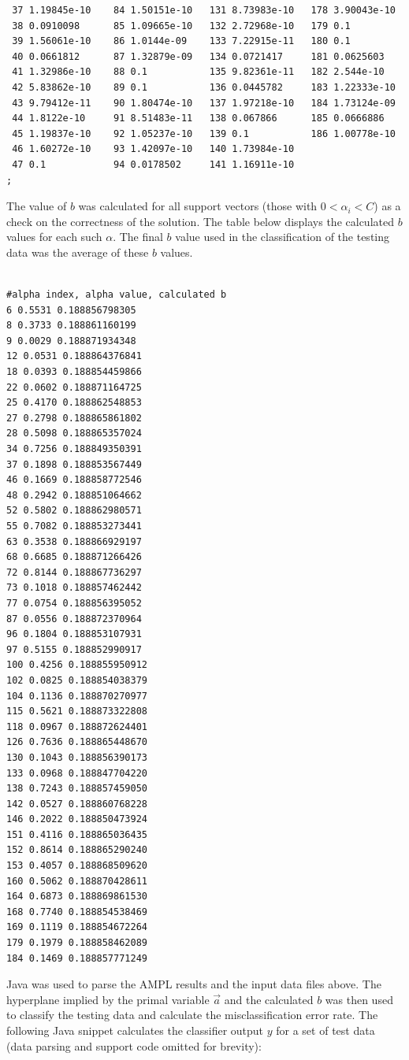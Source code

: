 \documentclass{article}
\begin{document}
\begin{verbatim}
 37 1.19845e-10    84 1.50151e-10   131 8.73983e-10   178 3.90043e-10
 38 0.0910098      85 1.09665e-10   132 2.72968e-10   179 0.1
 39 1.56061e-10    86 1.0144e-09    133 7.22915e-11   180 0.1
 40 0.0661812      87 1.32879e-09   134 0.0721417     181 0.0625603
 41 1.32986e-10    88 0.1           135 9.82361e-11   182 2.544e-10
 42 5.83862e-10    89 0.1           136 0.0445782     183 1.22333e-10
 43 9.79412e-11    90 1.80474e-10   137 1.97218e-10   184 1.73124e-09
 44 1.8122e-10     91 8.51483e-11   138 0.067866      185 0.0666886
 45 1.19837e-10    92 1.05237e-10   139 0.1           186 1.00778e-10
 46 1.60272e-10    93 1.42097e-10   140 1.73984e-10
 47 0.1            94 0.0178502     141 1.16911e-10
;

\end{verbatim}

The value of \(b\) was calculated for all support vectors (those with \(0 < \alpha_i < C\)) as a check on the correctness of the solution. The table below displays the calculated \(b\) values for each such \(\alpha\). The final \(b\) value used in the classification of the testing data was the average of these \(b\) values.

\begin{verbatim}

#alpha index, alpha value, calculated b
6 0.5531 0.188856798305
8 0.3733 0.188861160199
9 0.0029 0.188871934348
12 0.0531 0.188864376841
18 0.0393 0.188854459866
22 0.0602 0.188871164725
25 0.4170 0.188862548853
27 0.2798 0.188865861802
28 0.5098 0.188865357024
34 0.7256 0.188849350391
37 0.1898 0.188853567449
46 0.1669 0.188858772546
48 0.2942 0.188851064662
52 0.5802 0.188862980571
55 0.7082 0.188853273441
63 0.3538 0.188866929197
68 0.6685 0.188871266426
72 0.8144 0.188867736297
73 0.1018 0.188857462442
77 0.0754 0.188856395052
87 0.0556 0.188872370964
96 0.1804 0.188853107931
97 0.5155 0.188852990917
100 0.4256 0.188855950912
102 0.0825 0.188854038379
104 0.1136 0.188870270977
115 0.5621 0.188873322808
118 0.0967 0.188872624401
126 0.7636 0.188865448670
130 0.1043 0.188856390173
133 0.0968 0.188847704220
138 0.7243 0.188857459050
142 0.0527 0.188860768228
146 0.2022 0.188850473924
151 0.4116 0.188865036435
152 0.8614 0.188865290240
153 0.4057 0.188868509620
160 0.5062 0.188870428611
164 0.6873 0.188869861530
168 0.7740 0.188854538469
169 0.1119 0.188854672264
179 0.1979 0.188858462089
184 0.1469 0.188857771249

\end{verbatim}

Java was used to parse the AMPL results and the input data files above. The hyperplane implied by the primal variable \(\vec{a}\) and the calculated \(b\) was then used to classify the testing data and calculate the misclassification error rate. The following Java snippet calculates the classifier output \(y\) for a set of test data (data parsing and support code omitted for brevity):
\end{document}

